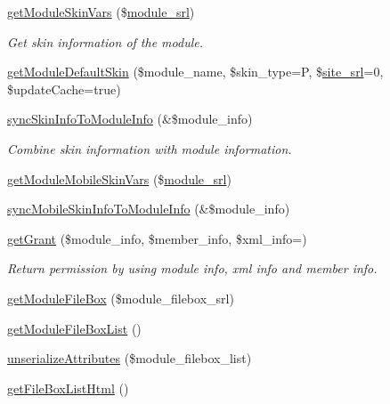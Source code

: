 \begin{DoxyCompactItemize}
\hyperlink{classmoduleModel_aa3828c94af2b1c8b84fafd423038445d}{get\+Module\+Skin\+Vars} (\$\hyperlink{ko_8install_8php_a370bb6450fab1da3e0ed9f484a38b761}{module\+\_\+srl})
\begin{DoxyCompactList}\small\item\em Get skin information of the module. \end{DoxyCompactList}\item 
\hyperlink{classmoduleModel_a740b445ffb57b7f7304cb7acf9f3f5b1}{get\+Module\+Default\+Skin} (\$module\+\_\+name, \$skin\+\_\+type=\textquotesingle{}P\textquotesingle{}, \$\hyperlink{ko_8install_8php_a8b1406b4ad1048041558dce6bfe89004}{site\+\_\+srl}=0, \$update\+Cache=true)
\item 
\hyperlink{classmoduleModel_af9179765de4796b45236b62be16eb8fb}{sync\+Skin\+Info\+To\+Module\+Info} (\&\$module\+\_\+info)
\begin{DoxyCompactList}\small\item\em Combine skin information with module information. \end{DoxyCompactList}\item 
\hyperlink{classmoduleModel_aef7f4760b4c1864752d1042e1a0667c8}{get\+Module\+Mobile\+Skin\+Vars} (\$\hyperlink{ko_8install_8php_a370bb6450fab1da3e0ed9f484a38b761}{module\+\_\+srl})
\item 
\hyperlink{classmoduleModel_ae90cd832480cf8c46e96d95c20a63387}{sync\+Mobile\+Skin\+Info\+To\+Module\+Info} (\&\$module\+\_\+info)
\item 
\hyperlink{classmoduleModel_a7ed08b703723a21e4d81b4aa89947264}{get\+Grant} (\$module\+\_\+info, \$member\+\_\+info, \$xml\+\_\+info=\textquotesingle{}\textquotesingle{})
\begin{DoxyCompactList}\small\item\em Return permission by using module info, xml info and member info. \end{DoxyCompactList}\item 
\hyperlink{classmoduleModel_a792e14b71d66044513a646a44216be17}{get\+Module\+File\+Box} (\$module\+\_\+filebox\+\_\+srl)
\item 
\hyperlink{classmoduleModel_a8f3a098b40649594a591e5ea8bd15d96}{get\+Module\+File\+Box\+List} ()
\item 
\hyperlink{classmoduleModel_a60ec88f0d61e7a44887bebba8048a18d}{unserialize\+Attributes} (\$module\+\_\+filebox\+\_\+list)
\item 
\hyperlink{classmoduleModel_acf3405bfe791d8bf7d8e7886b9481923}{get\+File\+Box\+List\+Html} ()
\item 

\end{DoxyCompactItemize}
